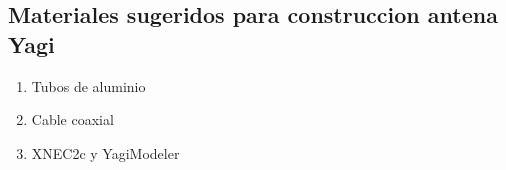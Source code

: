 \documentclass[onecolumn]{article}
\newcommand{\marco}[2]
{
{\fboxsep 10pt
    \begin{framed}

\section{#1}
#2
\end{framed}
}
}
\newcommand{\materiales}[1] { \marco{Materiales sugeridos para construccion antena Yagi}{#1} }
\begin{document}
\materiales{

\begin{enumerate}
  \item Tubos de aluminio
  \item Cable coaxial
  \item XNEC2c y YagiModeler    
\end{enumerate}
}







\end{document}
